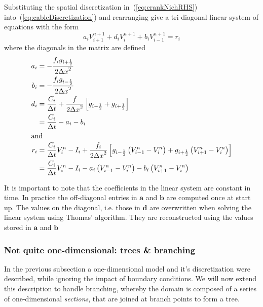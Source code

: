 \documentclass[11pt,a4paper]{article}
\newcommand{\eq}[1]{(\ref{#1})} %
\newcommand{\dx}{{\Delta x}} %
\newcommand{\dt}{{\Delta t}} %
\newcommand{\at}[1]{{#1}_{i}} %
\newcommand{\atplus}[1]{{#1}_{i+1}} %
\newcommand{\atminus}[1]{{#1}_{i-1}} %
\newcommand{\atplushalf}[1]{{#1}_{i+\frac{1}{2}}} %
\newcommand{\atminushalf}[1]{{#1}_{i-\frac{1}{2}}} %
\newcommand{\vv}[1]{\mathbf{#1}}
\begin{document}
Substituting the spatial discretization in~\eq{eq:crankNichRHS} into~\eq{eq:cableDiscretization} and rearranging give a tri-diagonal linear system of equations with the form
\begin{equation}
    \at{a} \atplus{V}^{n+1} + \at{d} \at{V}^{n+1} + \at{b} \atminus{V}^{n+1} = \at{r}
\end{equation}
where the diagonals in the matrix are defined
\begin{align}
    \at{a}  &=  -\frac{\at{f}\atplushalf{g}}{2\dx^2} \\
    \at{b}  &=  -\frac{\at{f}\atminushalf{g}}{2\dx^2} \\
    \at{d}  &=  \frac{\at{C}}{\dt} + \frac{f}{2\dx^2}\left[\atminushalf{g}+\atplushalf{g}\right] \nonumber\\
            &=  \frac{\at{C}}{\dt} - \at{a} - \at{b} \\
\intertext{and}
    \at{r}  &=  \frac{\at{C}}{\dt} \at{V}^n - \at{I} + \frac{\at{f}}{2\dx^2}
                    \left[
                        \atminushalf{g} \left( \atminus{V}^{n} - \at{V}^{n} \right)
                        +
                        \atplushalf{g}  \left( \atplus{V}^{n}  - \at{V}^{n} \right)
                    \right] \nonumber\\
            &=  \frac{\at{C}}{\dt} \at{V}^n
                - \at{I}
                - \at{a} \left( \atminus{V}^{n} - \at{V}^{n} \right)
                - \at{b} \left( \atplus{V}^{n}  - \at{V}^{n} \right)
\end{align}

It is important to note that the coefficients in the linear system are constant in time. In practice the off-diagonal entries in $\vv{a}$ and $\vv{b}$ are computed once at start up. The values on the diagonal, i.e. those in $\vv{d}$ are overwritten when solving the linear system using Thomas' algorithm. They are reconstructed using the values stored in $\vv{a}$ and $\vv{b}$
\subsubsection{Not quite one-dimensional: trees \& branching}
In the previous subsection a one-dimensional model and it's discretization were described, while ignoring the impact of boundary conditions. We will now extend this description to handle branching, whereby the domain is composed of a series of one-dimensional \emph{sections}, that are joined at branch points to form a tree.
\end{document}
